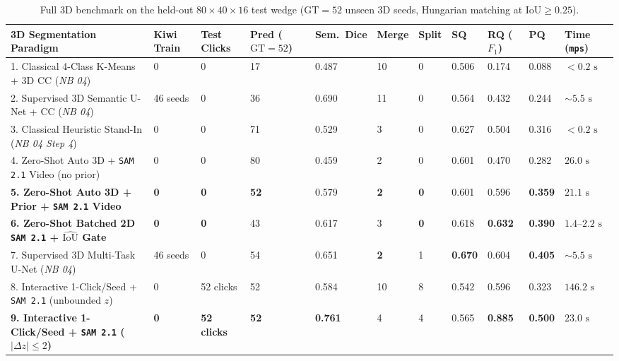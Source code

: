 \documentclass[10.5pt,a4paper]{article}
\begin{document}
\begin{table}[ht!]
\centering
\scriptsize
\renewcommand{\arraystretch}{1.2}
\begin{tabularx}{\textwidth}{Y C{1.15cm} C{1.15cm} C{0.95cm} C{0.90cm} C{0.85cm} C{0.80cm} C{0.85cm} C{0.95cm} C{0.95cm} R{1.15cm}}
\toprule
{}
\textbf{3D Segmentation Paradigm} & \textbf{Kiwi Train} & \textbf{Test Clicks} & \textbf{Pred ($\text{GT}\!=\!52$)} & \textbf{Sem.\ Dice} & \textbf{Merge} & \textbf{Split} & \textbf{SQ} & \textbf{RQ ($F_1$)} & \textbf{PQ} & \textbf{Time (\texttt{mps})} \\
. Classical 4-Class K-Means + 3D CC (\emph{NB 04}) & 0 & 0 & 17 & 0.487 & 10 & 0 & 0.506 & 0.174 & 0.088 & $<0.2\text{ s}$ \\
2. Supervised 3D Semantic U-Net + CC (\emph{NB 04}) & 46 seeds & 0 & 36 & 0.690 & 11 & 0 & 0.564 & 0.432 & 0.244 & $\sim 5.5\text{ s}$ \\
3. Classical Heuristic Stand-In (\emph{NB 04 Step 4}) & 0 & 0 & 71 & 0.529 & 3 & 0 & 0.627 & 0.504 & 0.316 & $<0.2\text{ s}$ \\
4. Zero-Shot Auto 3D + \texttt{SAM 2.1} Video (no prior) & 0 & 0 & 80 & 0.459 & 2 & 0 & 0.601 & 0.470 & 0.282 & $26.0\text{ s}$ \\
\textbf{5. Zero-Shot Auto 3D + Prior + \texttt{SAM 2.1} Video} & \textbf{0} & \textbf{0} & \textbf{52} & 0.579 & \textbf{2} & \textbf{0} & 0.601 & 0.596 & \textbf{0.359} & $21.1\text{ s}$ \\
\textbf{6. Zero-Shot Batched 2D \texttt{SAM 2.1} + $\widehat{\text{IoU}}$ Gate} & \textbf{0} & \textbf{0} & 43 & 0.617 & 3 & \textbf{0} & 0.618 & \textbf{0.632} & \textbf{0.390} & \textbf{$1.4\text{--}2.2\text{ s}$} \\
7. Supervised 3D Multi-Task U-Net (\emph{NB 04}) & 46 seeds & 0 & 54 & 0.651 & \textbf{2} & 1 & \textbf{0.670} & 0.604 & \textbf{0.405} & $\sim 5.5\text{ s}$ \\
8. Interactive 1-Click/Seed + \texttt{SAM 2.1} (unbounded $z$) & 0 & 52 clicks & 52 & 0.584 & 10 & 8 & 0.542 & 0.596 & 0.323 & $146.2\text{ s}$ \\
\textbf{9. Interactive 1-Click/Seed + \texttt{SAM 2.1} ($\lvert\Delta z\rvert \le 2$)} & \textbf{0} & \textbf{52 clicks} & \textbf{52} & \textbf{0.761} & 4 & 4 & 0.565 & \textbf{0.885} & \textbf{0.500} & \textbf{$23.0\text{ s}$} \\
\bottomrule
\end{tabularx}
\caption{Full 3D benchmark on the held-out $80 \times 40 \times 16$ test wedge ($\text{GT} = 52$ unseen 3D seeds, Hungarian matching at $\text{IoU} \ge 0.25$).}
\end{table}
\end{document}
